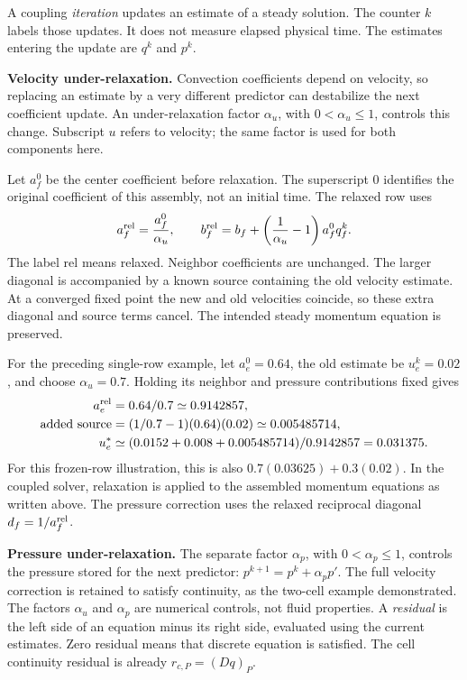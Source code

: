 \newpage
{}
A coupling \emph{iteration} updates an estimate of a steady solution. The
counter $k$ labels those updates. It does not measure elapsed physical time.
The estimates entering the update are $q^k$ and $p^k$.

\textbf{Velocity under-relaxation.} Convection coefficients depend on velocity,
so replacing an estimate by a very different predictor can destabilize the
next coefficient update. An under-relaxation factor $\alpha_u$, with
$0<\alpha_u\leq1$, controls this change. Subscript $u$ refers to velocity;
the same factor is used for both components here.

Let $a_f^0$ be the center coefficient before relaxation. The superscript $0$
identifies the original coefficient of this assembly, not an initial time.
The relaxed row uses
\[
a_f^{\rm rel}=\frac{a_f^0}{\alpha_u},\qquad
b_f^{\rm rel}=b_f+
\left(\frac{1}{\alpha_u}-1\right)a_f^0q_f^k.
\]
The label $\mathrm{rel}$ means relaxed. Neighbor coefficients are unchanged.
The larger diagonal is accompanied by a known source containing the old
velocity estimate. At a converged fixed point the new and old velocities
coincide, so these extra diagonal and source terms cancel. The intended
steady momentum equation is preserved.

For the preceding single-row example, let $a_e^0=0.64$, the old estimate be
$u_e^k=0.02$, and choose $\alpha_u=0.7$. Holding its neighbor and pressure
contributions fixed gives
\begin{align*}
a_e^{\rm rel}&=0.64/0.7\simeq0.9142857,\\
\text{added source}&=(1/0.7-1)(0.64)(0.02)\simeq0.005485714,\\
u_e^*&\simeq(0.0152+0.008+0.005485714)/0.9142857=0.031375.
\end{align*}
For this frozen-row illustration, this is also
$0.7(0.03625)+0.3(0.02)$. In the coupled solver, relaxation is applied
to the assembled momentum equations as written above. The pressure correction
uses the relaxed reciprocal diagonal $d_f=1/a_f^{\rm rel}$.

\textbf{Pressure under-relaxation.} The separate factor $\alpha_p$, with
$0<\alpha_p\leq1$, controls the pressure stored for the next predictor:
$p^{k+1}=p^k+\alpha_p p'$. The full velocity correction is retained to satisfy
continuity, as the two-cell example demonstrated. The factors $\alpha_u$ and
$\alpha_p$ are numerical controls, not fluid properties.
\newpage
{}
A \emph{residual} is the left side of an equation minus its right side,
evaluated using the current estimates. Zero residual means that discrete
equation is satisfied. The cell continuity residual is already
$r_{c,P}=(Dq)_P$.


